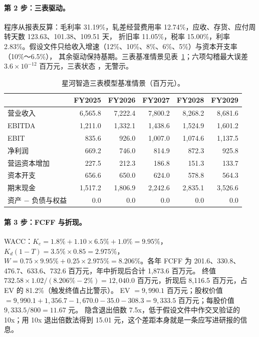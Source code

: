 \paragraph{第 2 步：三表驱动。} 程序从报表反算：毛利率 31.19\%，轧差经营费用率 12.74\%，应收、存货、应付周转天数 123.63、101.38、109.51 天，
折旧率 11.05\%，税率 15.00\%，利率 2.83\%。假设文件只给收入增速（12\%、10\%、8\%、6\%、5\%）与资本开支率（10\%～6.5\%），
其余驱动保持基期。三表基准情景见表~\ref{tab:val-ex-ts}；六项勾稽最大误差 $3.6\times10^{-12}$ 百万元，三表状态 ，无警示。

\begin{table}[t]
\centering
\caption{星河智造三表模型基准情景（百万元）。}
\label{tab:val-ex-ts}
\small
\begin{tabular}{@{}lrrrrr@{}}
\toprule
 & FY2025 & FY2026 & FY2027 & FY2028 & FY2029 \\
\midrule
营业收入 & 6,565.8 & 7,222.4 & 7,800.2 & 8,268.2 & 8,681.6 \\
EBITDA & 1,211.0 & 1,332.1 & 1,438.6 & 1,524.9 & 1,601.2 \\
EBIT & 835.6 & 926.0 & 1,007.0 & 1,074.6 & 1,137.5 \\
净利润 & 669.2 & 746.0 & 814.9 & 872.3 & 925.8 \\
营运资本增加 & 227.5 & 212.3 & 186.8 & 151.3 & 133.7 \\
资本开支 & 656.6 & 650.0 & 624.0 & 578.8 & 564.3 \\
期末现金 & 1,517.2 & 1,806.9 & 2,242.6 & 2,835.1 & 3,526.6 \\
资产 − 负债与权益 & 0.0 & 0.0 & 0.0 & 0.0 & 0.0 \\
\bottomrule
\end{tabular}
\end{table}

\paragraph{第 3 步：FCFF 与折现。} WACC：$K_e=1.8\%+1.10\times6.5\%+1.0\%=9.95\%$，$K_d(1-T)=3.5\%\times0.85=2.975\%$，
$W=0.75\times9.95\%+0.25\times2.975\%=8.206\%$。各年 FCFF 为 201.6、330.8、476.7、633.6、732.6 百万元，年中折现后合计 1,873.6 百万元。
终值 $732.58\times1.02/(8.206\%-2\%)=12{,}040.0$ 百万元，折现后 8,116.5 百万元，占 EV 的 81.2\%（触发终值占比警示）。
EV $=9{,}990.1$ 百万元；股权价值 $=9{,}990.1+1{,}356.7-1{,}670.0-35.0-308.3=9{,}333.5$ 百万元；每股价值 $9{,}333.5/800=11.67$ 元。
隐含退出倍数 7.5x，低于假设文件中作交叉验证的 10x；用 10x 退出倍数法得到 15.01 元，这个差距本身就是一条应写进研报的信息。

